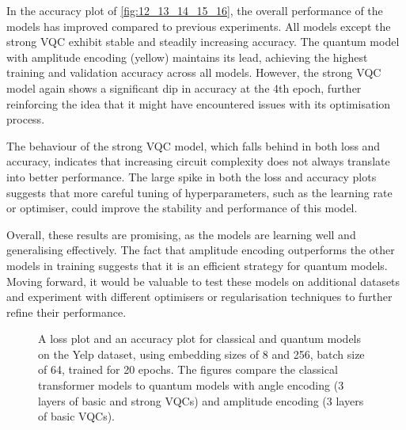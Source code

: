 In the accuracy plot of \autoref{fig:12_13_14_15_16}, the overall
performance of the models has
improved compared to previous experiments. All models except the
strong VQC exhibit stable and steadily increasing accuracy. The
quantum model with amplitude encoding (yellow) maintains its lead,
achieving the highest training and validation accuracy across all
models. However, the strong VQC model again shows a significant dip
in accuracy at the 4th epoch, further reinforcing the idea that it
might have encountered issues with its optimisation process.

The behaviour of the strong VQC model, which falls behind in both
loss and accuracy, indicates that increasing circuit complexity does
not always translate into better performance. The large spike in both
the loss and accuracy plots suggests that more careful tuning of
hyperparameters, such as the learning rate or optimiser, could
improve the stability and performance of this model.

Overall, these results are promising, as the models are learning well
and generalising effectively. The fact that amplitude encoding
outperforms the other models in training suggests that it is an
efficient strategy for quantum models. Moving forward, it would be
valuable to test these models on additional datasets and experiment
with different optimisers or regularisation techniques to further
refine their performance.

\begin{figure}[h]
  \begin{center}
  \end{center}
  \vspace{-0.5cm}
  \caption{A loss plot and an accuracy plot for classical and quantum
    models on the Yelp dataset, using embedding sizes of 8 and 256,
    batch size of 64, trained for 20 epochs. The figures compare the
    classical transformer models to quantum models with angle encoding
    (3 layers of basic and strong \glspl{VQC}) and amplitude encoding
  (3 layers of basic \glspl{VQC}).}
  \label{fig:17_18_19_20_21}
\end{figure}

